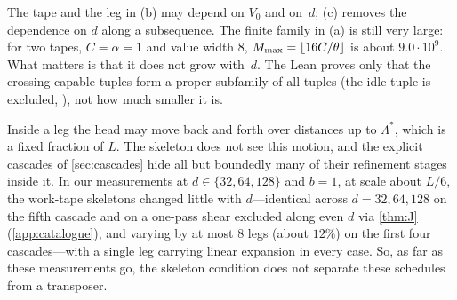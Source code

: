 The tape and the leg in (b) may depend on $V_0$ and on~$d$; (c) removes the dependence on $d$ along a subsequence. The finite
family in (a) is still very large: for two tapes, $C=\alpha=1$ and value width $8$, $M_{\max}=\lfloor16C/\theta\rfloor$ is about
$9.0\cdot10^9$. What matters is that it does not grow with~$d$. The Lean proves only that the crossing-capable tuples form a proper subfamily of all tuples (the idle
tuple is excluded, ), not how much smaller it is.

\begin{remark}\label{rem:skeleton-limits}
Inside a leg the head may move back and forth over distances up to $\Lambda^*$, which is a fixed fraction of $L$. The skeleton does
not see this motion, and the explicit cascades of \cref{sec:cascades} hide all but boundedly many of their refinement stages inside
it. In our measurements at $d\in\{32,64,128\}$ and $b=1$, at scale about $L/6$, the work-tape skeletons changed little with $d$---identical
across $d=32,64,128$ on the fifth cascade and on a one-pass shear excluded along even $d$ via \cref{thm:J} (\cref{app:catalogue}), and
varying by at most $8$ legs (about $12\%$) on the first four cascades---with a single leg carrying linear expansion in every case. So, as
far as these measurements go, the skeleton condition does not separate these schedules from a transposer.
\end{remark}
